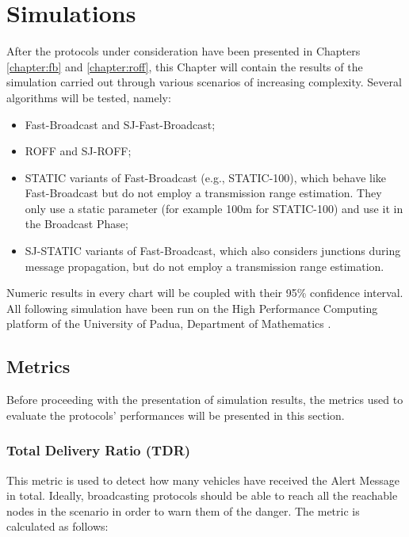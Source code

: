 

\chapter{Simulations}
	\label{chapter:simulations}
	After the protocols under consideration have been presented in Chapters \ref{chapter:fb} and \ref{chapter:roff}, this Chapter will contain the results of the simulation carried out through various scenarios of increasing complexity. Several algorithms will be tested, namely:
	\begin{itemize}
		\item Fast-Broadcast and SJ-Fast-Broadcast;
		\item ROFF and SJ-ROFF;
		\item STATIC variants of Fast-Broadcast (e.g., STATIC-100), which behave like Fast-Broadcast but do not employ a transmission range estimation. They only use a static parameter (for example 100m for STATIC-100) and use it in the Broadcast Phase;
		\item SJ-STATIC variants of Fast-Broadcast, which also considers junctions during message propagation, but do not employ a transmission range estimation.
	\end{itemize}
	
	
	Numeric results in every chart will be coupled with their 95\% confidence interval. All following simulation have been run on the High Performance Computing platform of the University of Padua, Department of Mathematics \cite{cluster}.
	
	\section{Metrics}
		\label{sec:metrics}
		Before proceeding with the presentation of simulation results, the metrics used to evaluate the protocols' performances will be presented in this section. 
		
		\subsection{Total Delivery Ratio (TDR)}
			\label{ssec:tdr}
			This metric is used to detect how many vehicles have received the Alert Message in total. Ideally, broadcasting protocols should be able to reach all the reachable nodes in the scenario in order to warn them of the danger. The metric is calculated as follows:
			
